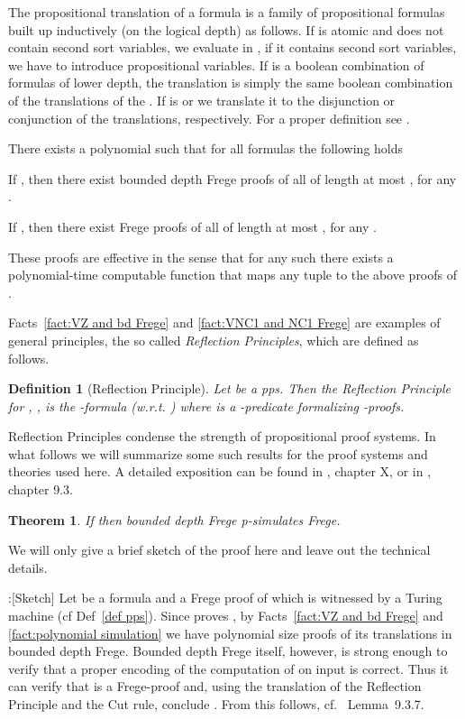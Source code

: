 \documentclass{LMCS}
\newtheorem{theorem}{Theorem}[section]
\newtheorem{definition}{Definition}[section]
\newenvironment{proof}{\QuadSpace\par\noindent{\bf
Proof}:}{\EndProof\HalfSpace} \fi
\newcommand{\QuadSpace}{}\newcommand{\HalfSpace}{}\newcommand{\FullSpace}{}\newcommand{\EndProof}{ \hfill \vrule width 1ex height 1ex depth 0pt }
\newenvironment{proof}{

\smallskip
\noindent\emph{Proof.}}{\hfill
\bigskip
} \fi
\begin{document}
The propositional translation  of a 
formula  is a family of propositional formulas built up inductively (on the logical
depth) as follows. If  is atomic and does not contain second sort variables, we evaluate  in
, if it contains second sort variables, we have to introduce propositional variables. If  is a
boolean combination of formulas  of lower depth, the translation is simply the same boolean combination
of the translations of the . If  is  or  we translate it to the
disjunction or conjunction of the translations, respectively. For a proper definition see \cite{CN10}.

\begin{fact}
  \label{fact:polynomial simulation}
  There exists a polynomial  such that for all  formulas  the
  following holds
  \begin{iteMize}{}
    \item If , then there exist bounded depth Frege
    proofs of all  of length at most , for
    any .
    \item If , then there exist Frege
    proofs of all  of length at most , for
    any .
  \end{iteMize}
  These proofs are effective in the sense that for any such  there exists a polynomial-time computable
  function  that maps any tuple  to the above proofs of .
\end{fact}

Facts~\ref{fact:VZ and bd Frege} and \ref{fact:VNC1 and NC1 Frege} are examples of general principles, the so
called {\em Reflection Principles}, which are defined as follows.

\begin{definition}
  [Reflection Principle] Let  be a pps. Then the {\em Reflection Principle}
  for , , is the -formula (w.r.t. )  where  is a -predicate formalizing
  -proofs.
\end{definition}

Reflection Principles condense the strength of propositional proof systems. In what follows we will summarize
some such results for the proof systems and theories used here. A detailed exposition can be found in
\cite{CN10}, chapter X, or in \cite{Kra95}, chapter 9.3.


\begin{theorem}\label{Thm Simulation by Reflection}
  If  then bounded depth Frege
  p-simulates Frege.
\end{theorem}
We will only give a brief sketch of the proof here and leave out the technical details.
\begin{proof}[Sketch]
Let  be a formula and  a Frege proof of  which is witnessed by a Turing machine
 (cf Def~\ref{def pps}). Since  proves , by Facts~\ref{fact:VZ and bd Frege} and
\ref{fact:polynomial simulation} we have polynomial size proofs of its translations  in bounded depth Frege. Bounded depth Frege itself, however, is strong enough to
verify that a proper encoding of the computation of  on input  is correct. Thus it
can verify that  is a Frege-proof and, using the translation of the Reflection Principle and the
Cut rule, conclude . From this  follows, cf.~\cite{Kra95}
Lemma~9.3.7.
\end{proof}
\end{document}
